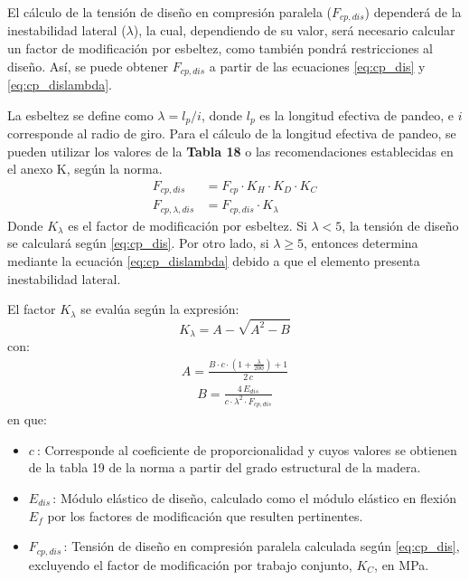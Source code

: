 El cálculo de la tensión de diseño en compresión paralela ($F_{cp,dis}$) dependerá de la inestabilidad lateral ($\lambda$), la cual, dependiendo de su valor, será necesario calcular un factor de modificación por esbeltez, como también pondrá restricciones al diseño. Así, se puede obtener $F_{cp,dis}$ a partir de las ecuaciones \ref{eq:cp_dis} y \ref{eq:cp_dislambda}. 

La esbeltez se define como $\lambda = l_p/i$, donde $l_p$ es la longitud efectiva de pandeo, e $i$ corresponde al radio de giro. Para el cálculo de la longitud efectiva de pandeo, se pueden utilizar los valores de la \textbf{Tabla 18} o las recomendaciones establecidas en el anexo K, según la norma.
\begin{subequations}
\begin{align}
	F_{cp,dis} &= F_{cp} \cdot K_H \cdot K_D \cdot K_C \label{eq:cp_dis}\\
	F_{cp,\lambda,dis} &= F_{cp,dis} \cdot K_{\lambda} \label{eq:cp_dislambda}
\end{align}
\end{subequations}
Donde $K_{\lambda}$ es el factor de modificación por esbeltez. Si $\lambda < 5$, la tensión de diseño se calculará según \ref{eq:cp_dis}. Por otro lado, si $\lambda \geq 5$, entonces determina mediante la ecuación \ref{eq:cp_dislambda} debido a que el elemento presenta inestabilidad lateral.

El factor $K_{\lambda}$ se evalúa según la expresión:
\begin{equation}\label{eq:k_lambda}
	K_{\lambda} = A - \sqrt{A^2 - B}
\end{equation}
con:
\begin{gather}
	A = \frac{B\cdot c\cdot (1 + \frac{\lambda}{200}) + 1}{2\,c}
\end{gather}
\vspace{-8mm}
\begin{gather}
	B = \frac{4\, E_{dis}}{c\cdot \lambda^2\cdot F_{cp,dis}}
\end{gather}
en que:
\begin{itemize}
	\item $c\:$: Corresponde al coeficiente de proporcionalidad y cuyos valores se obtienen de la tabla 19 de la norma a partir del grado estructural de la madera.
	\item $E_{dis}\,$: Módulo elástico de diseño, calculado como el módulo elástico en flexión $E_f$ por los factores de modificación que resulten pertinentes.  
	\item $F_{cp,dis}\,$: Tensión de diseño en compresión paralela calculada según \ref{eq:cp_dis}, excluyendo el factor de modificación por trabajo conjunto, $K_C$, en MPa.
\end{itemize}

